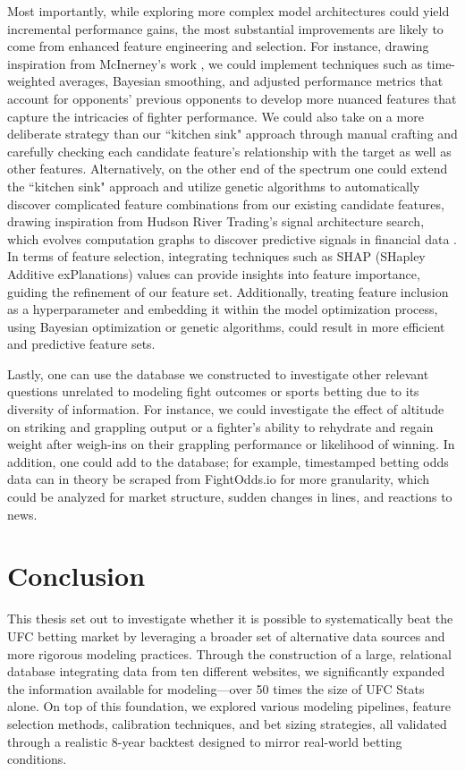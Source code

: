 \documentclass[12pt,twoside]{report}
\begin{document}
Most importantly, while exploring more complex model architectures could yield incremental performance gains, the most substantial improvements are likely to come from enhanced feature engineering and selection. For instance, drawing inspiration from McInerney's work \citep{mcinerney_mmaai}, we could implement techniques such as time-weighted averages, Bayesian smoothing, and adjusted performance metrics that account for opponents' previous opponents to develop more nuanced features that capture the intricacies of fighter performance. We could also take on a more deliberate strategy than our ``kitchen sink" approach through manual crafting and carefully checking each candidate feature's relationship with the target as well as other features. Alternatively, on the other end of the spectrum one could extend the ``kitchen sink" approach and utilize genetic algorithms to automatically discover complicated feature combinations from our existing candidate features, drawing inspiration from Hudson River Trading's signal architecture search, which evolves computation graphs to discover predictive signals in financial data \citep{hrt_2022, hrt_2023}. In terms of feature selection, integrating techniques such as SHAP (SHapley Additive exPlanations) values can provide insights into feature importance, guiding the refinement of our feature set. Additionally, treating feature inclusion as a hyperparameter and embedding it within the model optimization process, using Bayesian optimization or genetic algorithms, could result in more efficient and predictive feature sets.

Lastly, one can use the database we constructed to investigate other relevant questions unrelated to modeling fight outcomes or sports betting due to its diversity of information. For instance, we could investigate the effect of altitude on striking and grappling output or a fighter's ability to rehydrate and regain weight after weigh-ins on their grappling performance or likelihood of winning. In addition, one could add to the database; for example, timestamped betting odds data can in theory be scraped from FightOdds.io for more granularity, which could be analyzed for market structure, sudden changes in lines, and reactions to news.

\section{Conclusion}

This thesis set out to investigate whether it is possible to systematically beat the UFC betting market by leveraging a broader set of alternative data sources and more rigorous modeling practices. Through the construction of a large, relational database integrating data from ten different websites, we significantly expanded the information available for modeling---over 50 times the size of UFC Stats alone. On top of this foundation, we explored various modeling pipelines, feature selection methods, calibration techniques, and bet sizing strategies, all validated through a realistic 8-year backtest designed to mirror real-world betting conditions.
\end{document}
